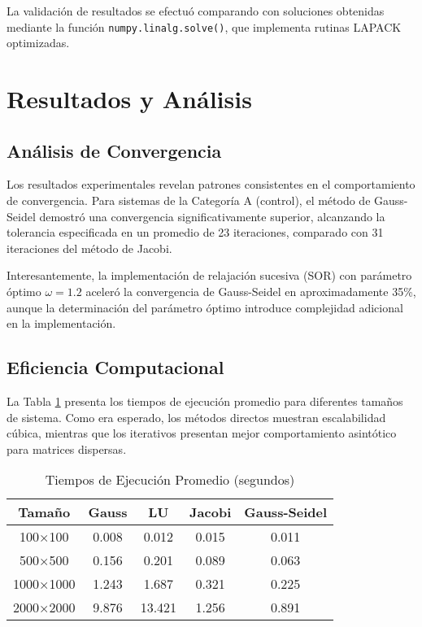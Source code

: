 \documentclass[conference]{IEEEtran}
\begin{document}
La validación de resultados se efectuó comparando con soluciones obtenidas mediante la función \texttt{numpy.linalg.solve()}, que implementa rutinas LAPACK optimizadas.

\section{Resultados y Análisis}

\subsection{Análisis de Convergencia}

Los resultados experimentales revelan patrones consistentes en el comportamiento de convergencia. Para sistemas de la Categoría A (control), el método de Gauss-Seidel demostró una convergencia significativamente superior, alcanzando la tolerancia especificada en un promedio de 23 iteraciones, comparado con 31 iteraciones del método de Jacobi.

Interesantemente, la implementación de relajación sucesiva (SOR) con parámetro óptimo $\omega = 1.2$ aceleró la convergencia de Gauss-Seidel en aproximadamente 35\%, aunque la determinación del parámetro óptimo introduce complejidad adicional en la implementación.

\subsection{Eficiencia Computacional}

La Tabla \ref{tab:tiempos} presenta los tiempos de ejecución promedio para diferentes tamaños de sistema. Como era esperado, los métodos directos muestran escalabilidad cúbica, mientras que los iterativos presentan mejor comportamiento asintótico para matrices dispersas.

\begin{table}[H]
\centering
\caption{Tiempos de Ejecución Promedio (segundos)}
\label{tab:tiempos}
\begin{tabular}{|c|c|c|c|c|}
\hline
Tamaño & Gauss & LU & Jacobi & Gauss-Seidel \\
\hline
100×100 & 0.008 & 0.012 & 0.015 & 0.011 \\
500×500 & 0.156 & 0.201 & 0.089 & 0.063 \\
1000×1000 & 1.243 & 1.687 & 0.321 & 0.225 \\
2000×2000 & 9.876 & 13.421 & 1.256 & 0.891 \\
\hline
\end{tabular}
\end{table}
\end{document}
